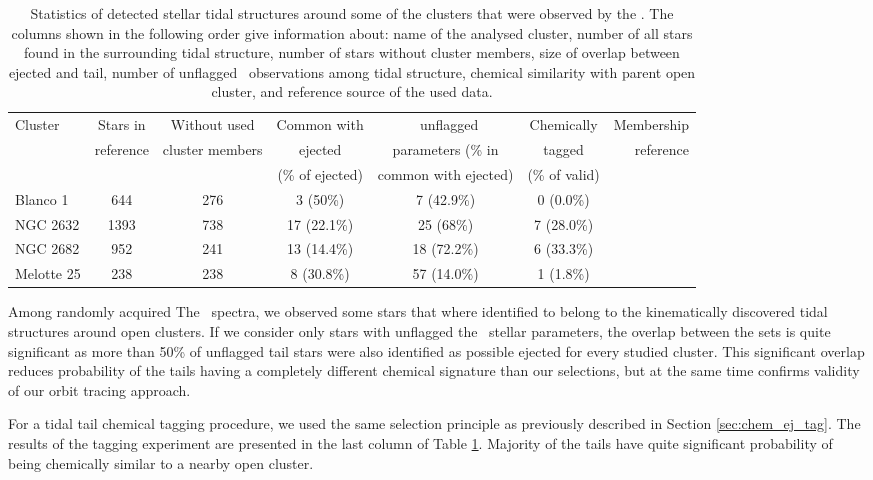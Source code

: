 \begin{table}
	\centering
	\caption{Statistics of detected stellar tidal structures around some of the clusters that were observed by the \Gh. The columns shown in the following order give information about: name of the analysed cluster, number of all stars found in the surrounding tidal structure, number of stars without cluster members, size of overlap between ejected and tail, number of unflagged \Gh\ observations among tidal structure, chemical similarity with parent open cluster, and reference source of the used data.}
	\begin{tabular}{l c c c c c r }
		\hline
		Cluster & Stars in & Without used & Common with & \Gh\ unflagged & Chemically & Membership\\
		& reference & cluster members & ejected & parameters (\% in & tagged & reference\\
		&  &  & (\% of ejected) & common with ejected) & (\% of valid) & \\
		\hline \hline
		Blanco 1   & 644 & 276 & 3 (50\%) & 7 (42.9\%) & 0 (0.0\%) & \citet{2019arXiv191206657Z} \\
		NGC 2632   & 1393 & 738 & 17 (22.1\%) & 25 (68\%) & 7 (28.0\%) & \citet{2019AA...627A...4R} \\
		NGC 2682   & 952 & 241 & 13 (14.4\%) & 18 (72.2\%) & 6 (33.3\%) & \citet{2019AA...627A.119C} \\
		Melotte 25 & 238 & 238 & 8 (30.8\%) & 57 (14.0\%) & 1 (1.8\%) & \citet{2019AA...621L...3M} \\
		\hline
	\end{tabular}
	\label{tab:cluster_stats_tails}
\end{table}

Among randomly acquired The \Gh\ spectra, we observed some stars that where identified to belong to the kinematically discovered tidal structures around open clusters. If we consider only stars with unflagged the \Gh\ stellar parameters, the overlap between the sets is quite significant as more than 50\% of unflagged tail stars were also identified as possible ejected for every studied cluster. This significant overlap reduces probability of the tails having a completely different chemical signature than our selections, but at the same time confirms validity of our orbit tracing approach. 

For a tidal tail chemical tagging procedure, we used the same selection principle as previously described in Section \ref{sec:chem_ej_tag}. The results of the tagging experiment are presented in the last column of Table \ref{tab:cluster_stats_tails}. Majority of the tails have quite significant probability of being chemically similar to a nearby open cluster. 

